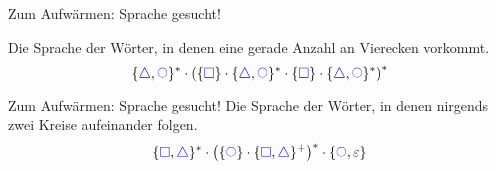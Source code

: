 \begin{frame}{Zum Aufwärmen: Sprache gesucht!}
	
	
	Die Sprache der Wörter, in denen eine gerade Anzahl an Vierecken vorkommt.
	\bigskip
	\pause
	$$ \{\mword \triangle, \mword \mycircle\}^* \cdot \left( \{\mword \square\} \cdot \{\mword \triangle, \mword \mycircle\}^* \cdot \{\mword \square\} \cdot \{\mword \triangle, \mword \mycircle\}^* \right)^* $$
	

\end{frame}

\begin{frame}{Zum Aufwärmen: Sprache gesucht!}
	Die Sprache der Wörter, in denen nirgends zwei Kreise aufeinander folgen.
	\bigskip
	\pause
	$$ \{\mword \square, \mword \triangle\}^* \cdot \left( \{\mword \mycircle\} \cdot \{\mword \square, \mword \triangle\}^+ \right)^* \cdot \{\mword \mycircle, \varepsilon\} $$
	

	
\end{frame}
